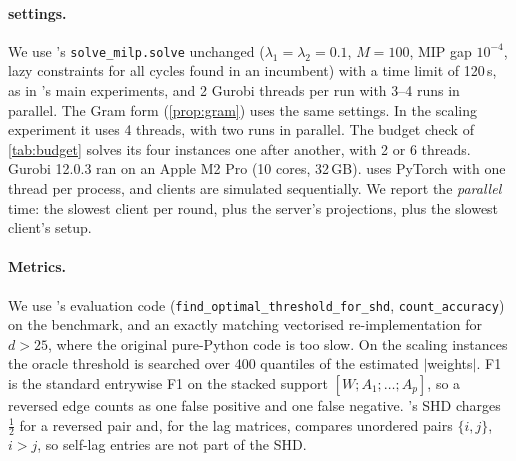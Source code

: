 \paragraph{\exdbn{} settings.}
We use \exdbn's \texttt{solve\_milp.solve} unchanged ($\lambda_1=\lambda_2=0.1$,
$M=100$, MIP gap $10^{-4}$, lazy constraints for all cycles found in an incumbent) with a
time limit of 120\,s, as in \exdbn's main experiments, and 2 Gurobi threads per run with
3--4 runs in parallel. The Gram form (\cref{prop:gram}) uses the same settings. In the
scaling experiment it uses 4 threads, with two runs in parallel. The budget check of
\cref{tab:budget} solves its four instances one after another, with 2 or 6 threads.
Gurobi 12.0.3 ran on an Apple M2 Pro (10 cores, 32\,GB). \feddbn{} uses PyTorch with one
thread per process, and clients are simulated sequentially. We report the \emph{parallel}
time: the slowest client per round, plus the server's projections, plus the slowest client's
setup.

\paragraph{Metrics.}
We use \exdbn's evaluation code (\texttt{find\_optimal\_threshold\_for\_shd},
\texttt{count\_accuracy}) on the \exdbn{} benchmark, and an exactly matching vectorised
re-implementation for $d>25$, where the original pure-Python code is too slow. On the
scaling instances the oracle threshold is searched over 400 quantiles of the estimated
$|$weights$|$. F1 is the standard entrywise F1 on the stacked support $[W;A_1;\dots;A_p]$, so a
reversed edge counts as one false positive and one false negative. \exdbn's SHD charges
$\tfrac12$ for a reversed pair and, for the lag matrices, compares unordered pairs
$\{i,j\}$, $i>j$, so self-lag entries are not part of the SHD.
